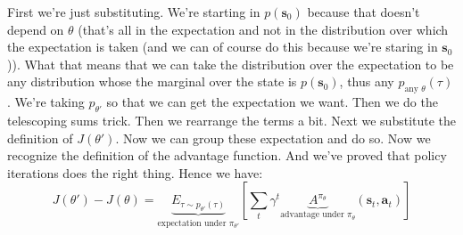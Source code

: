 \documentclass{report}
\begin{document}
First we're just substituting.
We're starting in $ p (\bm{s}_{0})  $ because that doesn't depend on $ \theta  $ (that's all in the expectation and not in the distribution over which 
the expectation is taken (and we can of course do this because we're staring in $ \bm{s}_{0}  $)).
What that means that we can take the distribution over the expectation to be any distribution  whose
the marginal over the state is $ p (\bm{s}_{0})  $, thus any $ p_{ \text{any  } \theta} (\tau) $.
We're taking $ p_{ \theta' }  $ so that we can get the expectation we want.
Then we do the telescoping sums trick.
Then we rearrange the terms a bit.
Next we substitute the definition of $ J (\theta')  $.
Now we can group these expectation and do so. Now we recognize the definition of the advantage function.
And we've proved that policy iterations does the right thing.
Hence we have:
\begin{equation}
J(\theta') - J (\theta) = 
\underbrace{E_{ \tau \sim p_{ \theta' } (\tau) } }_{ \text{expectation under } \pi_{ \theta' } }
\left[ \sum_{t}^{} \gamma^{ t } 
		\underbrace{A^{ \pi_{ \theta } } }_{ \text{advantage under } \pi_{ \theta }}
(\bm{s}_{t}, \bm{a}_{t} ) \right] 
\end{equation}
\end{document}
